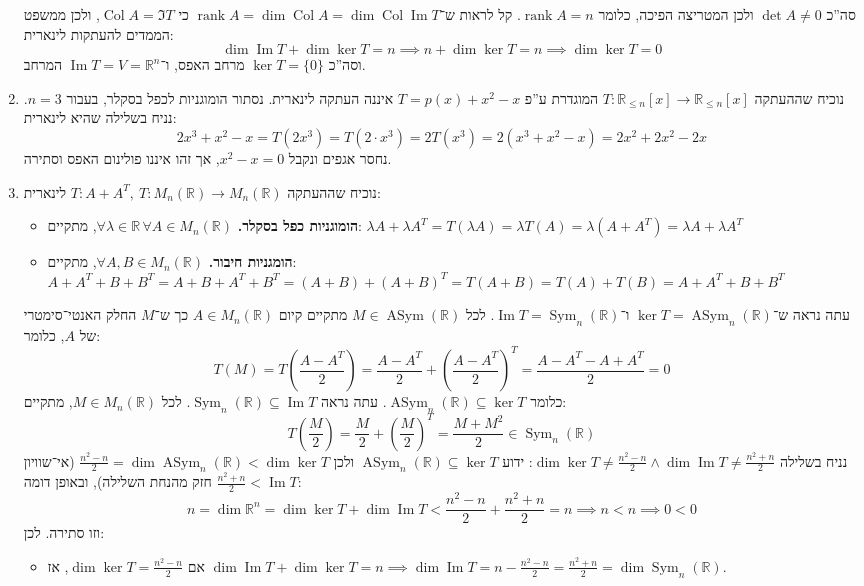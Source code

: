 \documentclass[]{article}
\newcommand\R     {\mathbb{R}}
\DeclareMathOperator\Img   {Im}
\DeclareMathOperator{\rk}     {rank}
\DeclareMathOperator{\col}    {Col}
\DeclareMathOperator{\Sym}     {Sym}
\DeclareMathOperator{\Asym}    {ASym}
\newcommand\co        {\colon}
\renewcommand\lg      {\lambda}
\newcommand\cl [1]    {\left ( #1 \right )}
\theoremstyle{definition}
\begin{document}
\begin{enumerate}[(1)]
        סה''כ $\det A \neq 0$ ולכן המטריצה הפיכה, כלומר $\rk A = n$. קל לראות ש־$\rk A = \dim \col A = \dim \col \Img T$ כי $\col A = \Im T$, ולכן ממשפט הממדים להעתקות לינארית:
        \[ \dim \Img T + \dim \ker T = n \implies n + \dim \ker T = n \implies \dim \ker T = 0 \]
        וסה''כ $\ker T = \{0\}$ מרחב האפס, ו־$\Img T = V = \R^n$ המרחב. 
        \item נוכיח שההעתקה $T \co \R_{\le n}[x] \to \R_{\le n}[x]$ המוגדרת ע''פ $T = p(x) + x^2 - x$ איננה העתקה לינארית. נסתור הומוגניות לכפל בסקלר, בעבור $n = 3$. נניח בשלילה שהיא לינארית: 
        \[ 2x^3 + x^2 - x = T(2x^3) = T(2 \cdot x^3) = 2 T(x^3) = 2(x^3 + x^2 - x) = 2x^2 + 2x^2 - 2x \]
        נחסר אגפים ונקבל $x^2 - x = 0$, אך זהו איננו פולינום האפס וסתירה. 
        \item נוכיח שההעתקה $T \co A + A^T, \ T \co M_n(\R) \to M_n(\R)$ לינארית: 
        \begin{itemize}
            \item \textbf{הומוגניות כפל בסקלר. }$\forall \lg \in \R\, \forall A \in M_n(\R)$, מתקיים: \hfill $\lg A + \lg A^T = T(\lg A) = \lg T(A) = \lg(A + A^T) = \lg A + \lg A^T$ 
            \item \textbf{הומגניות חיבור. }$\forall A, B \in M_n(\R)$, מתקיים: \hfill $A + A^T + B + B^T = A + B + A^T + B^T = (A + B) + (A + B)^T = T(A + B) = T(A) + T(B) = A + A^T + B + B^T$
        \end{itemize}
        עתה נראה ש־$\ker T = \Asym_n(\R)$ ו־$\Img T = \Sym_n(\R)$. לכל $M \in \Asym(\R)$ מתקיים קיום $A \in M_n(\R)$ כך ש־$M$ החלק האנטי־סימטרי של $A$, כלומר: 
        \[ T(M) = T\cl{\frac{A - A^T}{2}} = \frac{A - A^T}{2} + \cl{\frac{A - A^T}{2}}^T = \frac{A - A^T - A + A^T}{2} = 0 \]
        כלומר $\Asym_n(\R) \subseteq \ker T$. עתה נראה $\Sym_n(\R) \subseteq \Img T$. לכל $M \in M_n(\R)$, מתקיים: 
        \[ T\cl{\frac{M}{2}} = \frac{M}{2} + \cl{\frac{M}{2}}^T = \frac{M + M^2}{2} \in \Sym_n(\R) \]
        נניח בשלילה $\dim \ker T \neq \frac{n^2 - n}{2} \land \dim \Img T \neq \frac{n^2 + n}{2}$: ידוע $\Asym_n(\R) \subseteq \ker T$ ולכן $\frac{n^2 - n}{2}  = \dim \Asym_n(\R) < \dim \ker T$ (אי־שוויון חזק מהנחת השלילה), ובאופן דומה $\frac{n^2 + n}{2} < \Img T$: 
        \[ n = \dim \R^n = \dim \ker T + \dim \Img T < \frac{n^2 - n}{2} + \frac{n^2 + n}{2} = n \implies n < n \implies 0 < 0 \]
        וזו סתירה. לכן: 
        \begin{itemize}
            \item אם $\dim \ker T = \frac{n^2 - n}{2}$, אז $\dim \Img T + \dim \ker T = n \implies \dim \Img T = n - \frac{n^2 - n}{2} = \frac{n^2 + n}{2} = \dim \Sym_n(\R)$. 

\end{itemize}
\end{enumerate}
\end{document}
